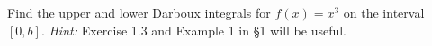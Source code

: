 
Find the upper and lower Darboux integrals for $f(x)=x^3$ on the interval
$[0,b]$. {\it Hint:} Exercise 1.3 and Example 1 in \S1 will be useful.